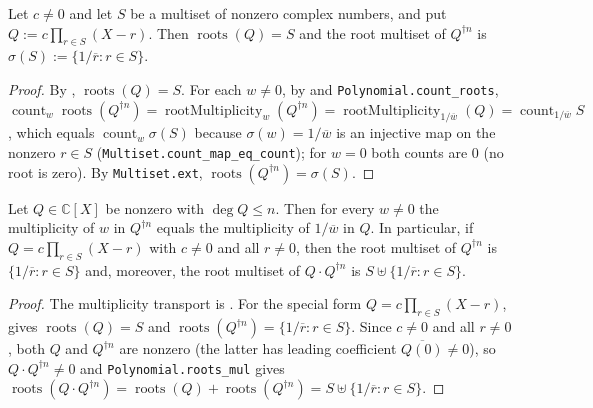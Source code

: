 \begin{lemma}
    \label{lem:fr-complementary-roots}
    \leanok
    Let $c \neq 0$ and let $S$ be a multiset of nonzero complex numbers, and put
    $Q := c\prod_{r \in S}(X - r)$. Then $\operatorname{roots}(Q) = S$ and the
    root multiset of $Q^{\dagger n}$ is $\sigma(S) := \{1/\overline{r} : r \in S\}$.
\end{lemma}
\begin{proof}
    By , $\operatorname{roots}(Q) = S$. For each
    $w \neq 0$, by  and
    \texttt{Polynomial.count\_roots}, $\operatorname{count}_w
    \operatorname{roots}(Q^{\dagger n}) = \operatorname{rootMultiplicity}_w
    (Q^{\dagger n}) = \operatorname{rootMultiplicity}_{1/\overline{w}}(Q)
    = \operatorname{count}_{1/\overline{w}} S$, which equals
    $\operatorname{count}_w \sigma(S)$ because $\sigma(w) = 1/\overline{w}$ is an
    injective map on the nonzero $r \in S$ (\texttt{Multiset.count\_map\_eq\_count});
    for $w = 0$ both counts are $0$ (no root is zero). By \texttt{Multiset.ext},
    $\operatorname{roots}(Q^{\dagger n}) = \sigma(S)$.
\end{proof}

\begin{lemma}
    \label{lem:fr-complementary}
    \leanok
    Let $Q \in \mathbb{C}[X]$ be nonzero with $\deg Q \le n$. Then for every
    $w \neq 0$ the multiplicity of $w$ in $Q^{\dagger n}$ equals the multiplicity
    of $1/\overline{w}$ in $Q$. In particular, if $Q = c\prod_{r \in S}(X - r)$
    with $c \neq 0$ and all $r \neq 0$, then the root multiset of $Q^{\dagger n}$
    is $\{1/\overline{r} : r \in S\}$ and, moreover, the root multiset of
    $Q\cdot Q^{\dagger n}$ is $S \uplus \{1/\overline{r} : r \in S\}$.
\end{lemma}
\begin{proof}
    The multiplicity transport is . For the
    special form $Q = c\prod_{r\in S}(X-r)$, 
    gives $\operatorname{roots}(Q) = S$ and
    $\operatorname{roots}(Q^{\dagger n}) = \{1/\overline{r} : r \in S\}$. Since
    $c \neq 0$ and all $r \neq 0$, both $Q$ and $Q^{\dagger n}$ are nonzero (the
    latter has leading coefficient $\overline{Q(0)} \neq 0$), so
    $Q\cdot Q^{\dagger n} \neq 0$ and \texttt{Polynomial.roots\_mul} gives
    $\operatorname{roots}(Q\cdot Q^{\dagger n})
    = \operatorname{roots}(Q) + \operatorname{roots}(Q^{\dagger n})
    = S \uplus \{1/\overline{r} : r \in S\}$.
\end{proof}

